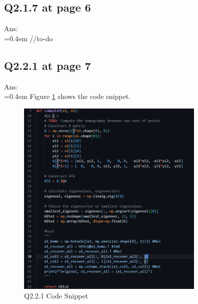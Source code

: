 \documentclass{article}
\begin{document}
	\newpage
	\subsection*{Q2.1.7 at page 6}
	Ans:\\
	\hangindent=0.4em \hspace{0.3em} //to-do
	
	\newpage
	\subsection*{Q2.2.1 at page 7}
	Ans:\\
	\hangindent=0.4em \hspace{0.3em} Figure \ref{fig:Q221_cns} shows the code snippet.
	\begin{figure}[H]		
		\centering
		\includegraphics[width=0.8\textwidth]{Q2_2_1.png}  %
		\caption{Q2.2.1 Code Snippet}
		\label{fig:Q221_cns}
	\end{figure}
	
	\newpage
\end{document}
